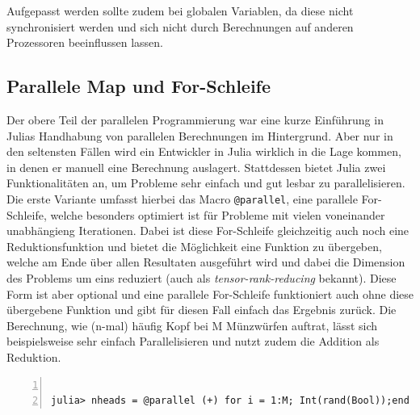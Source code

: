 \documentclass[proseminar,german,utf8]{zihpub}
\begin{document}
Aufgepasst werden sollte zudem bei globalen Variablen, da diese nicht synchronisiert werden und sich nicht durch Berechnungen auf anderen Prozessoren beeinflussen lassen.~\cite{JuliaLangDocumentation}

\subsection{Parallele Map und For-Schleife }

Der obere Teil der parallelen Programmierung war eine kurze Einführung in Julias Handhabung von parallelen Berechnungen im Hintergrund. Aber nur in den seltensten Fällen wird ein Entwickler in Julia wirklich in die Lage kommen, in denen er manuell eine Berechnung auslagert. Stattdessen bietet Julia zwei Funktionalitäten an, um Probleme sehr einfach und gut lesbar zu parallelisieren. Die erste Variante umfasst hierbei das Macro \verb|@parallel|, eine parallele For-Schleife, welche besonders optimiert ist für Probleme mit vielen voneinander unabhängieng Iterationen. Dabei ist diese For-Schleife gleichzeitig auch noch eine Reduktionsfunktion und bietet die Möglichkeit eine Funktion zu übergeben, welche am Ende über allen Resultaten ausgeführt wird und dabei die Dimension des Problems um eins reduziert (auch als \textit{tensor-rank-reducing} bekannt). Diese Form ist aber optional und eine parallele For-Schleife funktioniert auch ohne diese übergebene Funktion und gibt für diesen Fall einfach das Ergebnis zurück. Die Berechnung, wie (n-mal) häufig Kopf bei M Münzwürfen auftrat, lässt sich beispielsweise sehr einfach Parallelisieren und nutzt zudem die Addition als Reduktion.
\begin{Verbatim}[baselinestretch=1,fontsize=\scriptsize,numbers=left,stepnumber=5,xleftmargin=1cm,xrightmargin=1cm]

julia> nheads = @parallel (+) for i = 1:M; Int(rand(Bool));end

\end{Verbatim}
\end{document}
